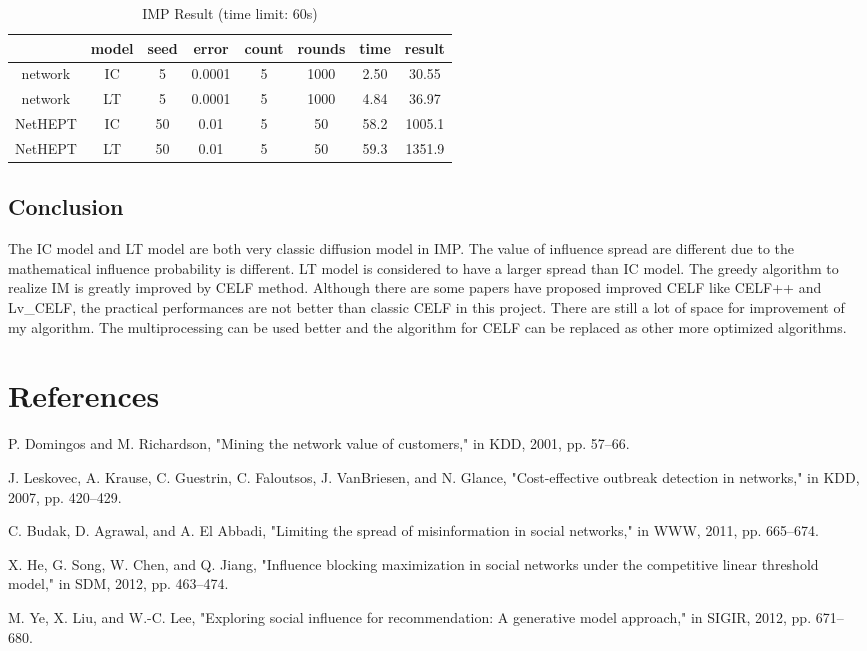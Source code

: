 \documentclass[9pt,shortpaper,twoside,web]{ieeecolor}
\begin{document}
\begin{table}[ht]
\centering
\caption{IMP Result (time limit: 60s)}
\begin{tabular}{|c|c|c|c|c|c|c|c|}
\hline
 & model & seed & error & count & rounds & time & result \\ \hline
network & IC & 5 & 0.0001 & 5 & 1000 & 2.50 & 30.55 \\ \hline
network & LT & 5 & 0.0001 & 5 & 1000 & 4.84 & 36.97 \\ \hline
NetHEPT & IC & 50 & 0.01 & 5 & 50 & 58.2 & 1005.1 \\ \hline
NetHEPT & LT & 50 & 0.01 & 5 & 50 & 59.3 & 1351.9 \\ \hline
\end{tabular}
\end{table}

\subsection{Conclusion}
The IC model and LT model are both very classic diffusion model in IMP. The value of influence spread are different due to the mathematical influence probability is different. LT model is considered to have a  larger spread than IC model. The greedy algorithm to realize IM is greatly improved by CELF method. Although there are some papers have proposed improved CELF like CELF++ and Lv\_CELF, the practical performances are not better than classic CELF in this project. There are still a lot of space for improvement of my algorithm. The multiprocessing can be used better and the algorithm for CELF can be replaced as other more optimized algorithms.

\bigskip
\section{References}
\bigskip
\noindent
[1] P. Domingos and M. Richardson, "Mining the network value of customers," in KDD, 2001, pp. 57–66.

\noindent
[2] J. Leskovec, A. Krause, C. Guestrin, C. Faloutsos, J. VanBriesen, and N. Glance, "Cost-effective outbreak detection in networks," in KDD, 2007, pp. 420–429.

\noindent
[3] C. Budak, D. Agrawal, and A. El Abbadi, "Limiting the spread of misinformation in social networks," in WWW, 2011, pp. 665–674.

\noindent
[4] X. He, G. Song, W. Chen, and Q. Jiang, "Influence blocking maximization in social networks under the competitive linear threshold model," in SDM, 2012, pp. 463–474.

\noindent
[5] M. Ye, X. Liu, and W.-C. Lee, "Exploring social influence for recommendation: A generative model approach," in SIGIR, 2012, pp. 671–680.
\end{document}
